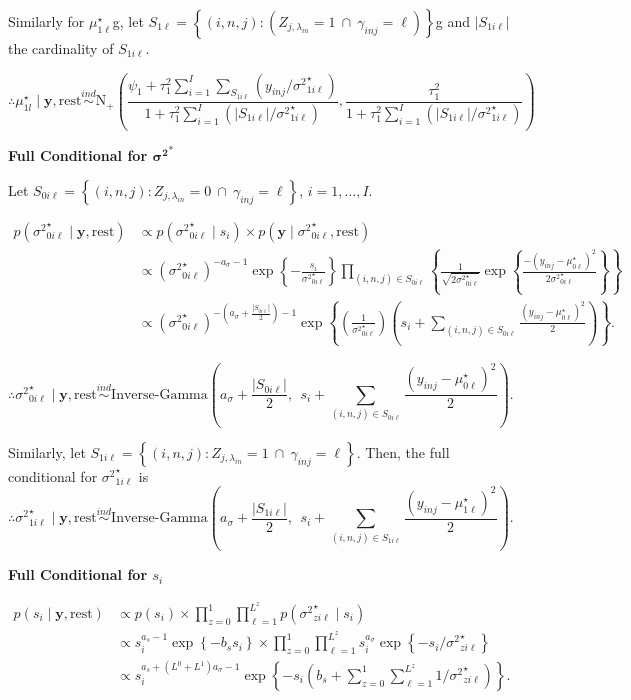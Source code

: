 \documentclass[12pt,]{article}
\newcommand{\p}[1]{\left(#1\right)}
\newcommand{\bc}[1]{ \left\{#1\right\} }
\newcommand{\abs}[1]{ \left|#1\right| }
\newcommand{\N}{ \mathcal{N} }
\newcommand{\ind}{\overset{ind}{\sim}}
\def\N{\text{N}}
\def\IG{\text{Inverse-Gamma}}
\def\lin{\lambda_{in}}
\def\y{\bm{y}}
\def\mus{\mu^\star}
\def\sss{{\sigma^2}^\star}
\def\rest{\text{rest}}
\begin{document}
Similarly for \(\mus_{1\ell}\)g, let
\(S_{1\ell} = \bc{(i,n,j) : \p{Z_{j,\lin} = 1 ~\cap~ \gamma_{inj} = \ell}}\)g
and \(|S_{1i\ell}|\) the cardinality of \(S_{1i\ell}\).

\[
\newcommand\musOnePostvarDenom{
  1 + \tau^2_1 \sum_{i=1}^I (|S_{1i\ell}|/{\sigma^2}^\star_{1i\ell})
}
\newcommand\musOnePostMeanNum{
  \psi_1 + \tau^2_1 \sum_{i=1}^I \sum_{S_{1i\ell}} (y_{inj} /
  {\sigma^2}^\star_{1i\ell})
}
\therefore \mus_{1l} \mid \y, \rest \ind \N_+\p{
  \frac{\musOnePostMeanNum}{\musOnePostvarDenom},
  \frac{\tau^2_1}{\musOnePostvarDenom}
}
\]
\vspace{2em}


\textbf{Full Conditional for $\bm{{\sigma^2}}^*$}

Let
\(S_{0i\ell} = \bc{(i, n,j): Z_{j,\lin} = 0 ~\cap~ \gamma_{inj}=\ell}\),
\(i=1, \ldots, I\).

\begin{align*}
p(\sss_{0i\ell} \mid \y, \rest) &\propto p(\sss_{0i\ell} \mid s_i) \times p(\y
  \mid \sss_{0i\ell}, \rest) \\
&\propto (\sss_{0i\ell})^{-a_\sigma-1} \exp\bc{-\frac{s_i}{\sss_{0i\ell}}} 
\prod_{(i,n,j)\in S_{0i\ell}} \bc{
  \frac{1}{\sqrt{2\sss_{0i\ell}}}
  \exp\bc{\frac{-(y_{inj}-\mus_{0\ell})^2}{2\sss_{0i\ell}}}
} \\
&\propto (\sss_{0i\ell})^{-(a_\sigma + \frac{\abs{S_{0i\ell}}}{2})-1}
\exp\bc{\p{\frac{1}{\sss_{0i\ell}}}\p{s_i + \sum_{(i,n,j)\in S_{0i\ell}}
\frac{(y_{inj}-\mus_{0\ell})^2}{2}
}}.
\end{align*}

\[
\therefore \sss_{0i\ell} \mid \y, \rest \ind
\IG\p{a_\sigma + \frac{\abs{S_{0i\ell}}}{2}, ~~ s_i + \sum_{(i,n,j)\in S_{0i\ell}}
\frac{(y_{inj}-\mus_{0\ell})^2}{2}
}.
\]

Similarly, let
\(S_{1i\ell} = \bc{(i, n,j): Z_{j,\lin} = 1 ~\cap~ \gamma_{inj}=\ell}\).
Then, the full conditional for \(\sss_{1i\ell}\) is \[
\therefore \sss_{1i\ell} \mid \y, \rest \ind
\IG\p{a_\sigma + \frac{\abs{S_{1i\ell}}}{2}, ~~ s_i + \sum_{(i,n,j)\in S_{1i\ell}}
\frac{(y_{inj}-\mus_{1\ell})^2}{2}
}.
\]
\vspace{2em}


\textbf{Full Conditional for $s_i$}

\begin{align*}
p(s_i \mid \y, \rest) &\propto p(s_i) \times \prod_{z=0}^1 \prod_{\ell=1}^{L^z}
  p(\sss_{zi\ell} \mid s_i)\\
&\propto s_i^{a_s-1} \exp\bc{-b_s s_i} \times \prod_{z=0}^1
  \prod_{\ell=1}^{L^z} s_i^{a_\sigma} \exp\bc{-s_i / \sss_{zi\ell}} \\
&\propto s_i^{a_s + (L^0 + L^1)a_\sigma - 1} \exp\bc{-s_i \p{b_s + \sum_{z=0}^1
\sum_{\ell=1}^{L^z} 1 / \sss_{zi\ell}}}.
\end{align*}
\end{document}

